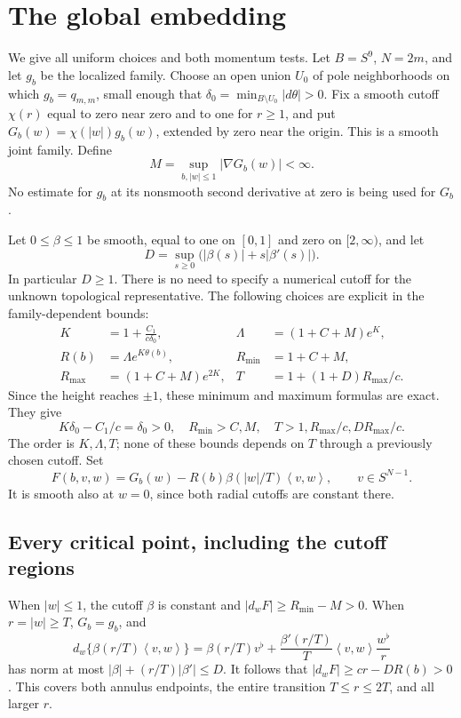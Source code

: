 \documentclass[11pt]{article}
\theoremstyle{remark}
\newcommand{\ip}[2]{\left\langle #1,#2\right\rangle}
\begin{document}
\section{The global embedding}
We give all uniform choices and both momentum tests.
Let \(B=S^9\), \(N=2m\), and let \(g_b\) be the localized family.
Choose an open union \(U_0\) of pole neighborhoods on which
\(g_b=q_{m,m}\), small enough that
\(\delta_0=\min_{B\setminus U_0}|d\theta|>0\).
Fix a smooth cutoff \(\chi(r)\) equal to zero near zero and to one
for \(r\geq1\), and put \(G_b(w)=\chi(|w|)g_b(w)\), extended by
zero near the origin. This is a smooth joint family. Define
\[
 M=\sup_{b,|w|\leq1}|\nabla G_b(w)|<\infty.
\]
No estimate for \(g_b\) at its nonsmooth second derivative at zero
is being used for \(G_b\).

Let \(0\leq\beta\leq1\) be smooth, equal to one on \([0,1]\)
and zero on \([2,\infty)\), and let
\[
 D=\sup_{s\geq0}\bigl(|\beta(s)|+s|\beta'(s)|\bigr).
\]
In particular \(D\geq1\). There is no need to specify a numerical
cutoff for the unknown topological representative. The following
choices are explicit in the family-dependent bounds:
\begin{equation}\label{eq:choices}
 \begin{aligned}
 K&=1+\frac{C_1}{c\delta_0},&
 \Lambda&=(1+C+M)e^K,\\
 R(b)&=\Lambda e^{K\theta(b)},&
 R_{\min}&=1+C+M,\\
 R_{\max}&=(1+C+M)e^{2K},&
 T&=1+(1+D)R_{\max}/c.
 \end{aligned}
\end{equation}
Since the height reaches \(\pm1\), these minimum and maximum
formulas are exact. They give
\[
 K\delta_0-C_1/c=\delta_0>0,\quad
 R_{\min}>C,M,\quad
 T>1,R_{\max}/c,DR_{\max}/c.
\]
The order is \(K,\Lambda,T\); none of these bounds depends on \(T\)
through a previously chosen cutoff.
Set
\begin{equation}\label{eq:F}
 F(b,v,w)=G_b(w)-R(b)\beta(|w|/T)\ip{v}{w},
       \qquad v\in S^{N-1}.
\end{equation}
It is smooth also at \(w=0\), since both radial cutoffs are constant
there.

\subsection{Every critical point, including the cutoff regions}
When \(|w|\leq1\), the cutoff \(\beta\) is constant and
\(|d_wF|\geq R_{\min}-M>0\).
When \(r=|w|\geq T\), \(G_b=g_b\), and
\[
 d_w\{\beta(r/T)\ip{v}{w}\}
  =\beta(r/T)v^\flat+
       \frac{\beta'(r/T)}{T}\ip{v}{w}\frac{w^\flat}{r}
\]
has norm at most \(|\beta|+(r/T)|\beta'|\leq D\).
It follows that \(|d_wF|\geq cr-DR(b)>0\).
This covers both annulus endpoints, the entire transition \(T\leq
r\leq2T\), and all larger \(r\).
\end{document}
